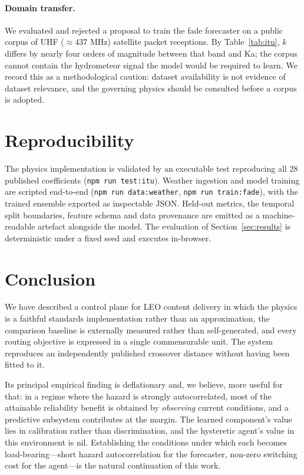 \documentclass[10pt,twocolumn]{article}
\begin{document}
\paragraph{Domain transfer.} We evaluated and rejected a proposal to train the
fade forecaster on a public corpus of UHF ($\approx437$ MHz) satellite packet
receptions. By Table~\ref{tab:itu}, $k$ differs by nearly four orders of
magnitude between that band and Ka; the corpus cannot contain the hydrometeor
signal the model would be required to learn. We record this as a methodological
caution: dataset availability is not evidence of dataset relevance, and the
governing physics should be consulted before a corpus is adopted.

\section{Reproducibility}

The physics implementation is validated by an executable test reproducing all
$28$ published coefficients (\texttt{npm run test:itu}). Weather ingestion and
model training are scripted end-to-end
(\texttt{npm run data:weather}, \texttt{npm run train:fade}), with the trained
ensemble exported as inspectable JSON. Held-out metrics, the temporal split
boundaries, feature schema and data provenance are emitted as a machine-readable
artefact alongside the model. The evaluation of Section~\ref{sec:results} is
deterministic under a fixed seed and executes in-browser.

\section{Conclusion}

We have described a control plane for LEO content delivery in which the physics
is a faithful standards implementation rather than an approximation, the
comparison baseline is externally measured rather than self-generated, and every
routing objective is expressed in a single commensurable unit. The system
reproduces an independently published crossover distance without having been
fitted to it.

Its principal empirical finding is deflationary and, we believe, more useful for
that: in a regime where the hazard is strongly autocorrelated, most of the
attainable reliability benefit is obtained by \emph{observing} current
conditions, and a predictive subsystem contributes at the margin. The learned
component's value lies in calibration rather than discrimination, and the
hysteretic agent's value in this environment is nil. Establishing the conditions
under which each becomes load-bearing---short hazard autocorrelation for the
forecaster, non-zero switching cost for the agent---is the natural continuation
of this work.
\end{document}
